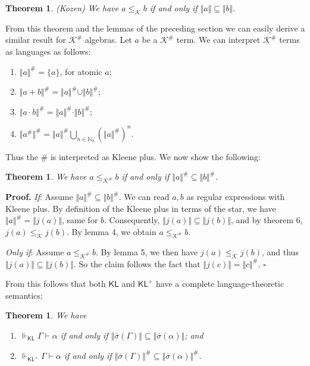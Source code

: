 \documentclass{eptcs}
\newtheorem{thm}[defn]{Theorem}
\newcommand{\proofbeg}{\textbf{Proof. }}
\newcommand{\proofend}{\hfill $\square$}
\newcommand{\KA}{\mathcal{K}}
\newcommand{\osigma}{\overline{\sigma}}
\newcommand{\KL}{\mathsf{KL}}
\begin{document}
\begin{thm}
(Kozen)
We have $a\leq_\KA b$ if and only if $\Vert a\Vert\subseteq\Vert b\Vert$.
\end{thm}

From this theorem and the lemmas of the preceding section we can easily
derive a similar result for $\KA^\#$ algebras. Let $a$ be a $\KA^\#$
term. We can interpret $\KA^\#$ terms as languages as follows:
\begin{enumerate}
\item $\Vert a\Vert^\#=\{a\}$, for atomic $a$;
\item $\Vert a+b\Vert^\#=\Vert a\Vert^\#\cup \Vert b\Vert^\#$;
\item $\Vert a\cdot b\Vert^\#=\Vert a\Vert^\#\cdot \Vert b\Vert^\#$;
\item $\Vert a^\#\Vert^\#=\Vert a\Vert^\#\bigcup_{n\in\mathbb{N}_0}(\Vert a\Vert^\#)^n$.
\end{enumerate}
Thus the $\#$ is interpreted as Kleene plus. We now show the following:

\begin{thm}
We have $a\leq_{\KA^\#}b$ if and only if 
$\Vert a\Vert^\#\subseteq\Vert b\Vert^\#$.
\end{thm}

\proofbeg
\textit{If}: Assume $\Vert a\Vert^\#\subseteq\Vert b\Vert^\#$. 
We can read
$a,b$ as regular expressions with Kleene plus. By definition of the
Kleene plus in terms of the star, we have $\Vert a\Vert^\#=\Vert j(a)\Vert$,
same for $b$. Consequently, $\Vert j(a)\Vert\subseteq\Vert j(b)\Vert$,
and by theorem 6, $j(a)\leq_\KA j(b)$. By lemma 4,
we obtain $a\leq_{\KA^\#}b$. 

\textit{Only if}: Assume $a\leq_{\KA^\#}b$. 
By lemma 5, we then have $j(a)\leq_\KA j(b)$, and thus
$\Vert j(a)\Vert\subseteq \Vert j(b)\Vert$. So the claim
follows the fact that $\Vert j(c)\Vert=\Vert c\Vert^\#$.
\proofend

From this follows that both $\KL$ and $\KL^+$ have a complete
language-theoretic semantics:

\begin{thm}
We have 
\begin{enumerate}
\item $\Vdash_\KL\Gamma\vdash\alpha$ if and only if 
$\Vert\osigma(\Gamma)\Vert\subseteq \Vert\osigma(\alpha)\Vert$; and
\item $\Vdash_{\KL^+}\Gamma\vdash\alpha$ if and only if 
$\Vert\osigma(\Gamma)\Vert^\#\subseteq \Vert\osigma(\alpha)\Vert^\#$.
\end{enumerate}
\end{thm}
\end{document}
